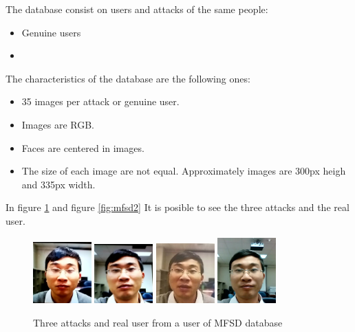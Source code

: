 The database consist on users and attacks of the same people:\\
\begin{itemize}
\item Genuine users
\item 
\end{itemize}

The characteristics of the database are the following ones:\\

\begin{itemize}
\item 35 images per attack or genuine user.
\item Images are RGB.
\item Faces are centered in images.
\item The size of each image are not equal. Approximately images are 300px heigh and 335px width.
\end{itemize}

In figure \ref{fig:mfsd} and figure \ref{fig:mfsd2} It is posible to see the three attacks and the real user.\\

\begin{figure}[htb]
\centering
\includegraphics[width=0.2\textwidth]{images_databases/MFSD/at1-1.jpg}
\includegraphics[width=0.2\textwidth]{images_databases/MFSD/at2-1.jpg}
\includegraphics[width=0.2\textwidth]{images_databases/MFSD/at3-1.jpg}
\includegraphics[width=0.2\textwidth]{images_databases/MFSD/1.jpg}
\caption{Three attacks and real user from a user of MFSD database } \label{fig:mfsd}
\end{figure}

